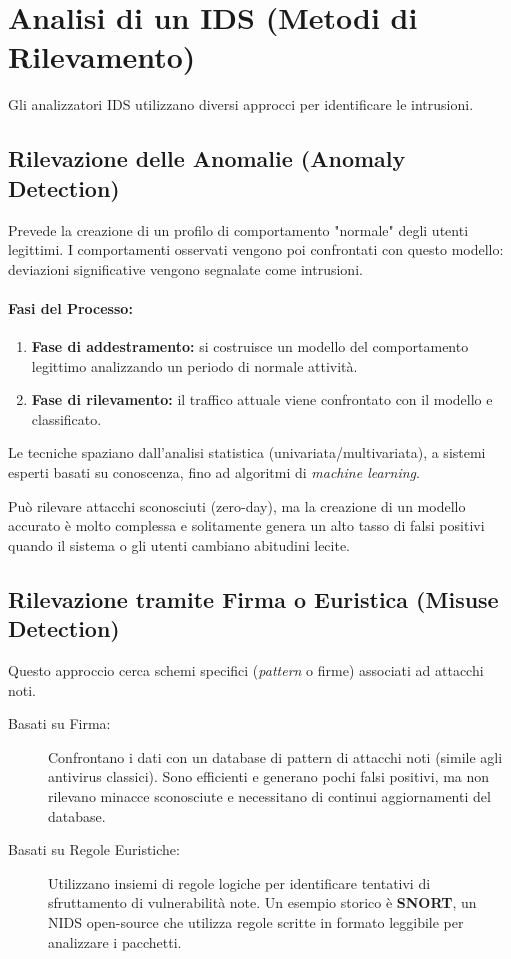 \section{Analisi di un IDS (Metodi di Rilevamento)}

Gli analizzatori IDS utilizzano diversi approcci per identificare le intrusioni.

\subsection{Rilevazione delle Anomalie (Anomaly Detection)}
Prevede la creazione di un profilo di comportamento "normale" degli utenti legittimi. I comportamenti osservati vengono poi confrontati con questo modello: deviazioni significative vengono segnalate come intrusioni.

\paragraph{Fasi del Processo:}
\begin{enumerate}
    \item \textbf{Fase di addestramento:} si costruisce un modello del comportamento legittimo analizzando un periodo di normale attività.
    \item \textbf{Fase di rilevamento:} il traffico attuale viene confrontato con il modello e classificato.
\end{enumerate}

Le tecniche spaziano dall'analisi statistica (univariata/multivariata), a sistemi esperti basati su conoscenza, fino ad algoritmi di \textit{machine learning}. 
\begin{notebox}
Può rilevare attacchi sconosciuti (zero-day), ma la creazione di un modello accurato è molto complessa e solitamente genera un alto tasso di falsi positivi quando il sistema o gli utenti cambiano abitudini lecite.
\end{notebox}

\subsection{Rilevazione tramite Firma o Euristica (Misuse Detection)}
Questo approccio cerca schemi specifici (\textit{pattern} o firme) associati ad attacchi noti.

\begin{description}
    \item[Basati su Firma:] Confrontano i dati con un database di pattern di attacchi noti (simile agli antivirus classici). Sono efficienti e generano pochi falsi positivi, ma non rilevano minacce sconosciute e necessitano di continui aggiornamenti del database.
    \item[Basati su Regole Euristiche:] Utilizzano insiemi di regole logiche per identificare tentativi di sfruttamento di vulnerabilità note. Un esempio storico è \textbf{SNORT}, un NIDS open-source che utilizza regole scritte in formato leggibile per analizzare i pacchetti.
\end{description}

